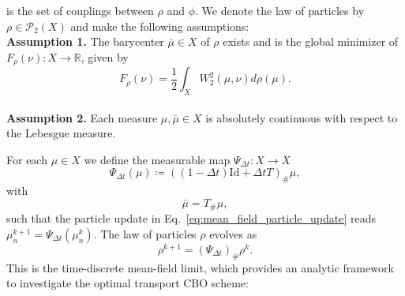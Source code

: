\documentclass[a4paper, 11pt]{article}
\newcommand{\R}{\mathbb{R}}
\newcommand{\PPw}{\mathcal{P}_{2}\left(X\right)}
\theoremstyle{plain} %
\begin{document}
	is the set of couplings between $ \rho $ and $ \phi $. We denote the law of particles by $ \rho \in \PPw $ and make the following assumptions:\\
	\textbf{Assumption 1.} The barycenter $ \bar{\mu} \in X $ of $ \rho$ exists and is the global minimizer of $ F_{\rho}(\nu) : X \to \R $, given by
	\begin{equation}
		F_{\rho}(\nu) = \frac{1}{2} \int_{X} W_{2}^{2}\left( \mu, \nu \right)d \rho(\mu).  
	\end{equation}\\  
	\textbf{Assumption 2.} Each measure $\mu, \bar{\mu} \in X$ is absolutely continuous with respect to the Lebesgue measure.

	For each $ \mu \in X $ we define the measurable map $\Psi_{\Delta t}:  X \to X$ 
	\begin{equation}
		\Psi_{\Delta t}(\mu) \coloneq \left( \left( 1 - \Delta t \right)\text{Id} + \Delta t T\right)_{\#} \mu,
	\end{equation}
	with 
	\begin{equation}
		\bar{\mu} = T_{\#}\mu, 
	\end{equation}
	such that the particle update in Eq.~\eqref{eq:mean_field_particle_update} reads $ 
	\mu_{n}^{k+1} = \Psi_{\Delta t}(\mu_{n}^{k})$. The law of particles $ \rho$ evolves as
	\begin{equation}
		\rho^{k+1} = \left( \Psi_{\Delta t} \right)_{\#} \rho^k. 
	\end{equation} 
	This is the time-discrete mean-field limit, which provides an analytic framework to investigate the optimal transport CBO scheme:
\end{document}
